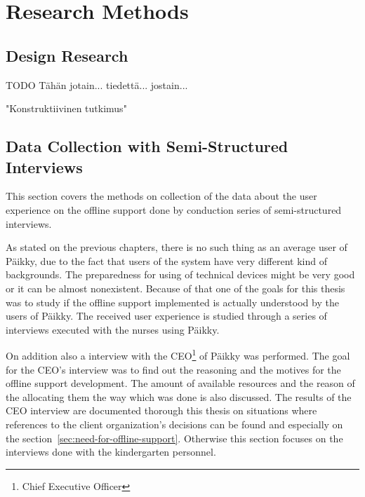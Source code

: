 \chapter{Research Methods}

\section{Design Research}
TODO Tähän jotain... tiedettä... jostain...

"Konstruktiivinen tutkimus"



\section{Data Collection with Semi-Structured Interviews}

This section covers the methods on collection of the data about the user experience on the offline support done by conduction series of semi-structured interviews.

As stated on the previous chapters, there is no such thing as an average user of Päikky, due to the fact that users of the system have very different kind of backgrounds. The preparedness for using of technical devices might be very good or it can be almost nonexistent. Because of that one of the goals for this thesis was to study if the offline support implemented is actually understood by the users of Päikky. The received user experience is studied through a series of interviews executed with the nurses using Päikky.

On addition also a interview with the CEO\footnote{Chief Executive Officer} of Päikky was performed. The goal for the CEO's interview was to find out the reasoning and the motives for the offline support development. The amount of available resources and the reason of the allocating them the way which was done is also discussed. The results of the CEO interview are documented thorough this thesis on situations where references to the client organization's decisions can be found and especially on the section~\ref{sec:need-for-offline-support}. Otherwise this section focuses on the interviews done with the kindergarten personnel.


